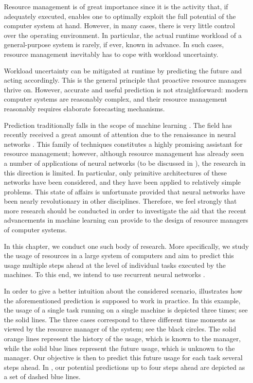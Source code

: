 Resource management is of great importance since it is the activity that, if
adequately executed, enables one to optimally exploit the full potential of the
computer system at hand. However, in many cases, there is very little control
over the operating environment. In particular, the actual runtime workload of a
general-purpose system is rarely, if ever, known in advance. In such cases,
resource management inevitably has to cope with workload uncertainty.

Workload uncertainty can be mitigated at runtime by predicting the future and
acting accordingly. This is the general principle that proactive resource
managers thrive on. However, accurate and useful prediction is not
straightforward: modern computer systems are reasonably complex, and their
resource management reasonably requires elaborate forecasting mechanisms.

Prediction traditionally falls in the scope of machine learning
\cite{hastie2013}. The field has recently received a great amount of attention
due to the renaissance in neural networks \cite{goodfellow2016}. This family of
techniques constitutes a highly promising assistant for resource management;
however, although resource management has already seen a number of applications
of neural networks (to be discussed in ), the research in this
direction is limited. In particular, only primitive architectures of these
networks have been considered, and they have been applied to relatively simple
problems. This state of affairs is unfortunate provided that neural networks
have been nearly revolutionary in other disciplines. Therefore, we feel strongly
that more research should be conducted in order to investigate the aid that the
recent advancements in machine learning can provide to the design of resource
managers of computer systems.

In this chapter, we conduct one such body of research. More specifically, we
study the usage of resources in a large system of computers and aim to predict
this usage multiple steps ahead at the level of individual tasks executed by the
machines. To this end, we intend to use recurrent neural networks
\cite{goodfellow2016}.

In order to give a better intuition about the considered scenario,
 illustrates how the aforementioned prediction is
supposed to work in practice. In this example, the  usage of a single
task running on a single machine is depicted three times; see the solid lines.
The three cases correspond to three different time moments as viewed by the
resource manager of the system; see the black circles. The solid orange lines
represent the history of the usage, which is known to the manager, while the
solid blue lines represent the future usage, which is unknown to the manager.
Our objective is then to predict this future usage for each task several steps
ahead. In , our potential predictions up to four steps
ahead are depicted as a set of dashed blue lines.

